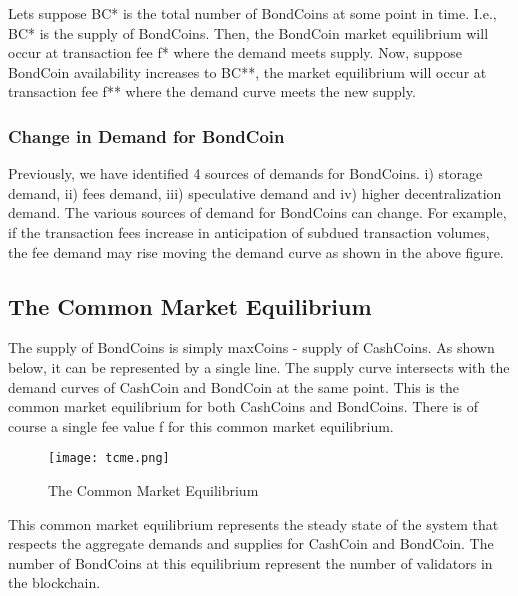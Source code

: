 
Lets suppose BC* is the total number of BondCoins at some point in time. I.e., BC* is the supply of BondCoins. Then, the BondCoin market equilibrium will occur at transaction fee f* where the demand meets supply. Now, suppose BondCoin availability increases to BC**, the market equilibrium will occur at transaction fee f** where the demand curve meets the new supply.

\subsubsection{Change in Demand for BondCoin}

Previously, we have identified 4 sources of demands for BondCoins. i) storage demand, ii) fees demand, iii) speculative demand and iv) higher decentralization demand. The various sources of demand for BondCoins can change. For example, if the transaction fees increase in anticipation of subdued transaction volumes, the fee demand may rise moving the demand curve as shown in the above figure.

\subsection{The Common Market Equilibrium}

The supply of BondCoins is simply maxCoins - supply of CashCoins. As shown below, it can be represented by a single line. The supply curve intersects with the demand curves of CashCoin and BondCoin at the same point. This is the common market equilibrium for both CashCoins and BondCoins. There is of course a single fee value f for this common market equilibrium.

\begin{figure}[!htbp]
\centering
\texttt{[image: tcme.png]}
\caption{The Common Market Equilibrium}
\label{fig35}
\end{figure}

This common market equilibrium represents the steady state of the system that respects the aggregate demands and supplies for CashCoin and BondCoin. The number of BondCoins at this equilibrium represent the number of validators in the blockchain.
